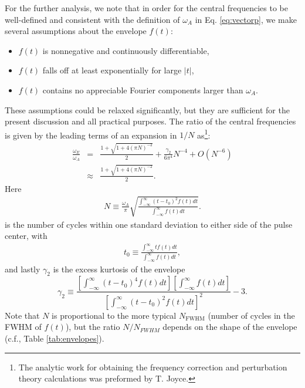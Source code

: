 For the further analysis, we note that in order for the central frequencies to be well-defined and consistent with the definition of $\omega_A$ in Eq. \ref{eq:vectorp}, we make several assumptions about the envelope $f(t)$:
\begin{itemize}
  \item $f(t)$ is nonnegative and continuously differentiable,
  \item $f(t)$ falls off at least exponentially for large $|t|$, 
\item $f(t)$ contains no appreciable Fourier components larger than $\omega_A$.
\end{itemize}
These assumptions could be relaxed significantly, but they are sufficient for the present discussion and all practical purposes. The ratio of the central frequencies is given by the leading terms of an expansion in $1/N$ as\footnote{The analytic work for obtaining the frequency correction and perturbation theory calculations was preformed by T. Joyce.}:
\begin{eqnarray}
\label{eq:fshift}
\frac{\omega_E}{\omega_A} 
&=& 
\frac{1+\sqrt{1+4(\pi N)^{-2}}}{2}+ \frac{\gamma_2}{6\pi^4} N^{-4} + O( N^{-6})
\\
\label{eq:fshiftapprox}
&\approx& 
\frac{1+\sqrt{1+4(\pi N)^{-2}}}{2}.
\end{eqnarray}
%
Here
%
\begin{equation}
\begin{split}
\label{eq:nbar}
 N \equiv \frac{\omega_A}{\pi} \sqrt{\frac{\int_{-\infty}^{\infty} (t-t_0)^2 f(t) dt}{\int_{-\infty}^{\infty} f(t) dt}}.
\end{split}
\end{equation}
%
is the number of cycles within one standard deviation to either side of the pulse center, with
%
\begin{equation}
\begin{split}
t_0 \equiv \frac{\int_{-\infty}^{\infty} t f(t) dt}{\int_{-\infty}^{\infty} f(t) dt},
\end{split}
\end{equation}
%
and lastly $\gamma_2$ is the excess kurtosis of the envelope
%
\begin{equation}
\label{eq:gamma2}
\gamma_2 \equiv \frac{\left[\int_{-\infty}^{\infty} (t-t_0)^4 f(t) dt\right]\left[\int_{-\infty}^{\infty} f(t) dt\right]}{\left[\int_{-\infty}^{\infty} (t-t_0)^2 f(t) dt\right]^2}-3.
\end{equation}
%
Note that $N$ is proportional to the more typical $N_{\text{FWHM}}$ (number of cycles in the FWHM of $f(t)$), but the ratio $N/N_{FWHM}$ depends on the shape of the envelope (c.f., Table \ref{tab:envelopes}). 

